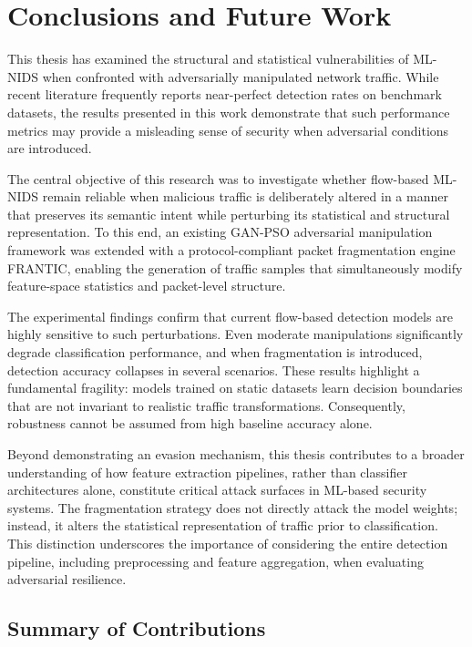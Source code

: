 \chapter{Conclusions and Future Work}
\label{cha:conclusions}

This thesis has examined the structural and statistical vulnerabilities of ML-NIDS when confronted with adversarially manipulated network traffic. While recent literature frequently reports near-perfect detection rates on benchmark datasets, the results presented in this work demonstrate that such performance metrics may provide a misleading sense of security when adversarial conditions are introduced.

The central objective of this research was to investigate whether flow-based ML-NIDS remain reliable when malicious traffic is deliberately altered in a manner that preserves its semantic intent while perturbing its statistical and structural representation. To this end, an existing GAN-PSO adversarial manipulation framework was extended with a protocol-compliant packet fragmentation engine FRANTIC, enabling the generation of traffic samples that simultaneously modify feature-space statistics and packet-level structure.

The experimental findings confirm that current flow-based detection models are highly sensitive to such perturbations. Even moderate manipulations significantly degrade classification performance, and when fragmentation is introduced, detection accuracy collapses in several scenarios. These results highlight a fundamental fragility: models trained on static datasets learn decision boundaries that are not invariant to realistic traffic transformations. Consequently, robustness cannot be assumed from high baseline accuracy alone.

Beyond demonstrating an evasion mechanism, this thesis contributes to a broader understanding of how feature extraction pipelines, rather than classifier architectures alone, constitute critical attack surfaces in ML-based security systems. The fragmentation strategy does not directly attack the model weights; instead, it alters the statistical representation of traffic prior to classification. This distinction underscores the importance of considering the entire detection pipeline, including preprocessing and feature aggregation, when evaluating adversarial resilience.

\section{Summary of Contributions}

